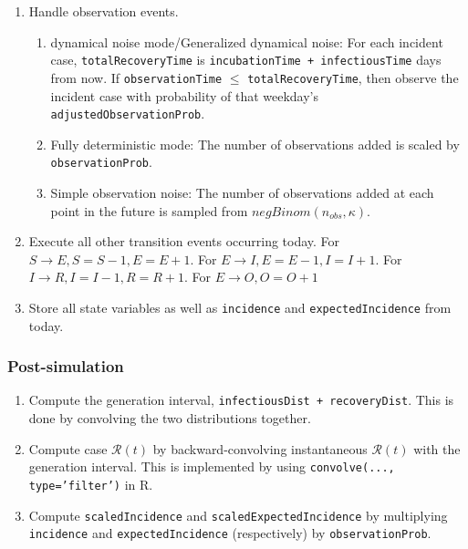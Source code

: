 \documentclass{article}
\newcommand{\nR}{\mathcal{R}}
\newcommand{\code}[1]{\texttt{#1}}
\begin{document}
\begin{enumerate}
    \item Handle observation events.
        \begin{enumerate}
            \item dynamical noise mode/Generalized dynamical noise: For each incident case, \code{totalRecoveryTime} is \code{incubationTime + infectiousTime} days from now. If \code{observationTime} $\leq$ \code{totalRecoveryTime}, then observe the incident case with probability of that weekday's \linebreak \code{adjustedObservationProb}. 
            \item Fully deterministic mode: The number of observations added is scaled by \code{observationProb}.
            \item Simple observation noise: The number of observations added at each point in the future is sampled from $negBinom(n_{obs}, \kappa)$.

        \end{enumerate}
    
    \item Execute all other transition events occurring today. For $S \rightarrow E, S=S-1, E=E+1$. For $E \rightarrow I, E=E-1, I=I+1$. For $I \rightarrow R, I = I-1, R = R+1$. For $E \rightarrow O, O = O+1$
    

    
    \item Store all state variables as well as \code{incidence} and \code{expectedIncidence} from today.
\end{enumerate}

\subsubsection{Post-simulation}
\begin{enumerate}
    \item Compute the generation interval, \code{infectiousDist + recoveryDist}. This is done by convolving the two distributions together. 
    \item Compute case $\nR(t)$ by backward-convolving instantaneous $\nR(t)$ with the generation interval. This is implemented by using \code{convolve(..., type='filter')} in R.
    \item Compute \code{scaledIncidence} and \code{scaledExpectedIncidence} by multiplying \code{incidence} and \code{expectedIncidence} (respectively) by \code{observationProb}.
\end{enumerate}
\end{document}
